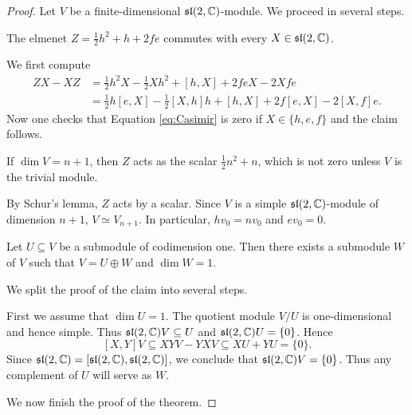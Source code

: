 \begin{proof}
    Let $V$ be a finite-dimensional $\mathfrak{sl}(2,\mathbb{C})$-module. 
    We proceed in several steps.
    
    \begin{claim}
        The elmenet $Z=\frac12h^2+h+2fe$ commutes with every $X\in\mathfrak{sl}(2,\mathbb{C})$. 
    \end{claim}
    
    We first compute
    \begin{equation}
        \begin{aligned}
            \label{eq:Casimir}
            ZX-XZ &= \frac12h^2X-\frac12Xh^2+[h,X]+2feX-2Xfe\\
            &=\frac12h[e,X]-\frac12[X,h]h+[h,X]+2f[e,X]-2[X,f]e.
        \end{aligned}
    \end{equation}
    Now one checks that 
    Equation \eqref{eq:Casimir} is zero if $X\in\{h,e,f\}$ and
    the claim follows. 
    
    \begin{claim}
        If $\dim V=n+1$, then $Z$ acts as the scalar 
        $\frac12n^2+n$, which is not zero unless $V$ is the trivial module. 
    \end{claim}
    
    By Schur's lemma, $Z$ acts by a scalar. Since $V$ is a simple
    $\mathfrak{sl}(2,\mathbb{C})$-module of dimension $n+1$, $V\simeq V_{n+1}$. In particular, 
    $hv_0=nv_0$ and $ev_0=0$. 
    
    \begin{claim}
        Let $U\subseteq V$ be a submodule of codimension one. Then 
        there exists a submodule $W$ of $V$ such that $V=U\oplus W$ 
        and $\dim W=1$. 
    \end{claim}
    
    We split the proof of the claim into several steps. 
    
    First we assume that
    $\dim U=1$. The quotient module $V/U$ is one-dimensional and hence simple. 
    Thus $\mathfrak{sl}(2,\mathbb{C})V\subseteq U$ and $\mathfrak{sl}(2,\mathbb{C})U=\{0\}$. Hence 
    \[
    [X,Y]V\subseteq XYV-YXV\subseteq XU+YU=\{0\}.
    \]
    Since $\mathfrak{sl}(2,\mathbb{C})=[\mathfrak{sl}(2,\mathbb{C}),\mathfrak{sl}(2,\mathbb{C})]$, we conclude that
    $\mathfrak{sl}(2,\mathbb{C})V=\{0\}$. Thus any complement of $U$ will serve as $W$. 
    
    \medskip
    We now finish the proof of the theorem. 
\end{proof}


